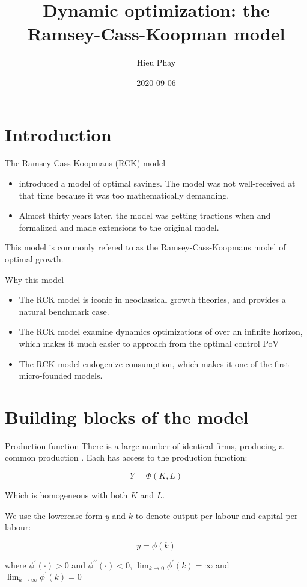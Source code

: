 \documentclass[10pt]{beamer}
\author{Hieu Phay}
\date{2020-09-06}
\title{Dynamic optimization: the Ramsey-Cass-Koopman model}
\begin{document}
\maketitle

\section{Introduction}
\label{sec:orgdb10c95}
\begin{frame}[label={sec:orge74cf71}]{The Ramsey-Cass-Koopmans (RCK) model}
\begin{itemize}
\item \textcite{Ramsey1928} introduced a model of optimal savings. The model was not well-received at that time because it was too mathematically demanding.
\item Almost thirty years later, the model was getting tractions when \textcite{RePEc:cwl:cwldpp:163} and \textcite{Cass1965} formalized and made extensions to the original model.
\end{itemize}

This model is commonly refered to as the \alert{Ramsey-Cass-Koopmans model of optimal growth}.
\end{frame}

\begin{frame}[label={sec:orgb344fd7}]{Why this model}
\begin{itemize}
\item The RCK model is iconic in neoclassical growth theories, and provides a natural benchmark case.
\item The RCK model examine dynamics optimizations of over an infinite horizon, which makes it much easier to approach from the optimal control PoV
\item The RCK model endogenize consumption, which makes it one of the first micro-founded models.
\end{itemize}
\end{frame}

\section{Building blocks of the model}
\label{sec:org0ac65d9}
\begin{frame}[label={sec:orga703f67}]{Production function}
There is a large number of identical firms, producing a common production . Each has access to the production function:

$$
Y = \Phi(K, L)
$$

Which is \alert{homogeneous} with both \(K\) and \(L\).

We use the lowercase form \(y\) and \(k\) to denote output per labour and capital per labour:

$$
y = \phi(k)
$$

where \(\phi^{\prime}(\cdot) > 0\) and \(\phi^{\prime\prime}(\cdot) < 0\), \(\lim_{k \to 0} \phi^{'}(k) = \infty\) and \(\lim_{k \to \infty} \phi^{'}(k) = 0\)
\end{frame}
\end{document}
